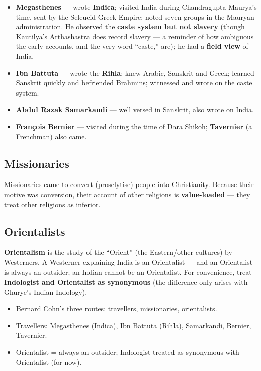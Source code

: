 \begin{itemize}
\item \textbf{Megasthenes} --- wrote \textbf{Indica}; visited India during Chandragupta Maurya's time, sent by the Seleucid Greek Empire; noted seven groups in the Mauryan administration. He observed the \textbf{caste system but not slavery} (though Kautilya's Arthashastra does record slavery --- a reminder of how ambiguous the early accounts, and the very word ``caste,'' are); he had a \textbf{field view} of India.
\item \textbf{Ibn Battuta} --- wrote the \textbf{Rihla}; knew Arabic, Sanskrit and Greek; learned Sanskrit quickly and befriended Brahmins; witnessed and wrote on the caste system.
\item \textbf{Abdul Razak Samarkandi} --- well versed in Sanskrit, also wrote on India.
\item \textbf{Fran\c{c}ois Bernier} --- visited during the time of Dara Shikoh; \textbf{Tavernier} (a Frenchman) also came.
\end{itemize}

\subsection{Missionaries}

Missionaries came to convert (proselytise) people into Christianity. Because their motive was conversion, their account of other religions is \textbf{value-loaded} --- they treat other religions as inferior.

\subsection{Orientalists}

\begin{KeyConcept}
\textbf{Orientalism} is the study of the ``Orient'' (the Eastern/other cultures) by Westerners. A Westerner explaining India is an Orientalist --- and an Orientalist is always an outsider; an Indian cannot be an Orientalist. For convenience, treat \textbf{Indologist and Orientalist as synonymous} (the difference only arises with Ghurye's Indian Indology).
\end{KeyConcept}

\begin{QuickRevision}
\begin{itemize}
\item Bernard Cohn's three routes: travellers, missionaries, orientalists.
\item Travellers: Megasthenes (Indica), Ibn Battuta (Rihla), Samarkandi, Bernier, Tavernier.
\item Orientalist = always an outsider; Indologist treated as synonymous with Orientalist (for now).
\end{itemize}
\end{QuickRevision}

